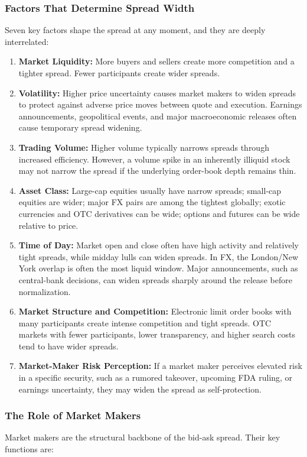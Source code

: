 \documentclass[12pt,openany]{book}
\begin{document}
\subsubsection{Factors That Determine Spread Width}
Seven key factors shape the spread at any moment, and they are deeply interrelated:

\begin{enumerate}[leftmargin=*]
    \item \textbf{Market Liquidity:} More buyers and sellers create more competition and a tighter spread. Fewer participants create wider spreads.
    \item \textbf{Volatility:} Higher price uncertainty causes market makers to widen spreads to protect against adverse price moves between quote and execution. Earnings announcements, geopolitical events, and major macroeconomic releases often cause temporary spread widening.
    \item \textbf{Trading Volume:} Higher volume typically narrows spreads through increased efficiency. However, a volume spike in an inherently illiquid stock may not narrow the spread if the underlying order-book depth remains thin.
    \item \textbf{Asset Class:} Large-cap equities usually have narrow spreads; small-cap equities are wider; major FX pairs are among the tightest globally; exotic currencies and OTC derivatives can be wide; options and futures can be wide relative to price.
    \item \textbf{Time of Day:} Market open and close often have high activity and relatively tight spreads, while midday lulls can widen spreads. In FX, the London/New York overlap is often the most liquid window. Major announcements, such as central-bank decisions, can widen spreads sharply around the release before normalization.
    \item \textbf{Market Structure and Competition:} Electronic limit order books with many participants create intense competition and tight spreads. OTC markets with fewer participants, lower transparency, and higher search costs tend to have wider spreads.
    \item \textbf{Market-Maker Risk Perception:} If a market maker perceives elevated risk in a specific security, such as a rumored takeover, upcoming FDA ruling, or earnings uncertainty, they may widen the spread as self-protection.
\end{enumerate}

\subsubsection{The Role of Market Makers}
Market makers are the structural backbone of the bid-ask spread. Their key functions are:
\end{document}
